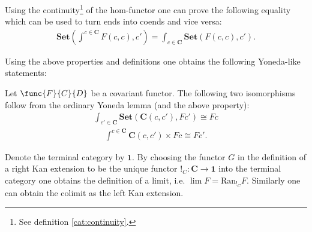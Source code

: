     \begin{property}
        Using the continuity\footnote{See definition \ref{cat:continuity}.} of the hom-functor one can prove the following equality which can be used to turn ends into coends and vice versa:
        \begin{gather}
            \mathbf{Set}\left(\int^{c\in\mathbf{C}}F(c, c), c'\right) = \int_{c\in\mathbf{C}}\mathbf{Set}\left(F(c, c), c'\right).
        \end{gather}
    \end{property}

    Using the above properties and definitions one obtains the following Yoneda-like statements:
    \begin{theorem}
        Let $\func{F}{C}{D}$ be a covariant functor. The following two isomorphisms follow from the ordinary Yoneda lemma (and the above property):
        \begin{gather}
            \int_{c'\in\mathbf{C}}\mathbf{Set}\left(\mathbf{C}(c, c'), Fc'\right)\cong Fc
        \end{gather}
        \begin{gather}
            \int^{c\in\mathbf{C}}\mathbf{C}(c, c')\times Fc\cong Fc'.
        \end{gather}
    \end{theorem}

    \begin{example}[Limit]
        Denote the terminal category by $\mathbf{1}$. By choosing the functor $G$ in the definition of a right Kan extension to be the unique functor $!_C:\mathbf{C}\rightarrow\mathbf{1}$ into the terminal category one obtains the definition of a limit, i.e. $\lim F = \text{Ran}_{!_C}F$. Similarly one can obtain the colimit as the left Kan extension.
    \end{example}

